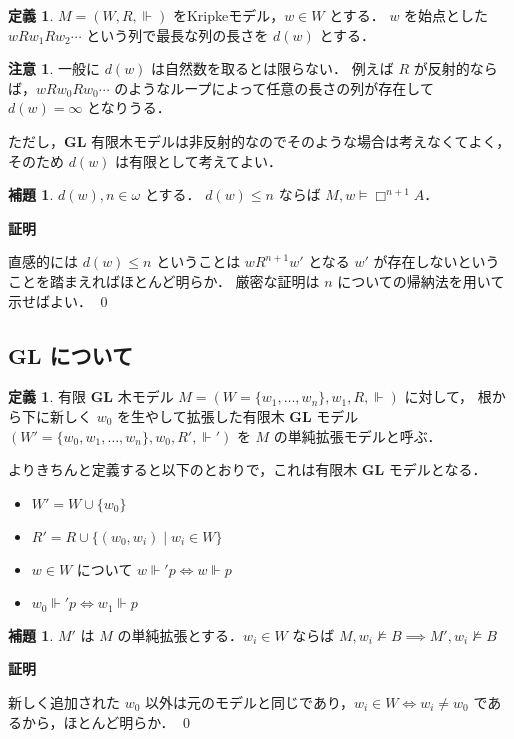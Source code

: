 \documentclass{jsarticle}
\makeatletter
\newcommand*{\Logic}[1]{\mathbf{#1}}
\newcommand*{\LogicGL}{\Logic{GL}}
\theoremstyle{definition}
\newtheorem{lemma}[theorem]{補題}
\newtheorem{definition}[theorem]{定義}
\newtheorem{remark}[theorem]{注意}
\renewcommand{\proofname}{証明}
\renewenvironment{proof}[1][\proofname]{\par
    \normalfont 
    \topsep6\p@\@plus6\p@\relax
    \trivlist
    \item\relax
    {\bfseries\gtfamily
    #1\@addpunct{.}}\hspace\labelsep\ignorespaces
    }{%
    \endtrivlist
    \@endpefalse
}
\makeatother
\begin{document}
\begin{definition}
	$M = (W, R, \Vdash)$ をKripkeモデル，$w \in W$ とする．
	$w$ を始点とした $w R w_1 R w_2 \cdots$ という列で最長な列の長さを $d(w)$ とする．
\end{definition}

\begin{remark}
	一般に $d(w)$ は自然数を取るとは限らない．
	例えば $R$ が反射的ならば，$w R w_0 R w_0 \cdots$ のようなループによって任意の長さの列が存在して $d(w) = \infty$ となりうる．

	ただし，$\LogicGL$ 有限木モデルは非反射的なのでそのような場合は考えなくてよく，そのため $d(w)$ は有限として考えてよい．
\end{remark}

\begin{lemma}\label{lem:cannot_access}
	$d(w), n \in \omega$ とする．
	$d(w) \leq n$ ならば $M,w \vDash \Box^{n + 1} A$．
\end{lemma}

\begin{proof}
	直感的には $d(w) \leq n$ ということは $w R^{n + 1} w'$ となる $w'$ が存在しないということを踏まえればほとんど明らか．
	厳密な証明は $n$ についての帰納法を用いて示せばよい．
	\qed
\end{proof}

\subsection{$\LogicGL$ について}

\begin{definition}
	有限 $\LogicGL$ 木モデル $M = (W = \{w_1,\dots,w_n\}, w_1, R, \Vdash)$ に対して，
	根から下に新しく $w_0$ を生やして拡張した有限木 $\LogicGL$ モデル $(W' = \{w_0,w_1,\dots,w_n\}, w_0, R', \Vdash')$ を $M$ の単純拡張モデルと呼ぶ．

	よりきちんと定義すると以下のとおりで，これは有限木 $\LogicGL$ モデルとなる．
	\begin{itemize}
		\item $W' = W \cup \{w_0\}$
		\item $R' = R \cup \{(w_0,w_i) \mid w_i \in W\}$
		\item $w \in W$ について $w \Vdash' p \iff w \Vdash p$
		\item $w_0 \Vdash' p \iff w_1 \Vdash p$
	\end{itemize}
\end{definition}

\begin{lemma}\label{lem:simple_extension}
	$M'$ は $M$ の単純拡張とする．$w_i \in W$ ならば $M,w_i \nvDash B \implies M',w_i \nvDash B$
\end{lemma}
\begin{proof}
	新しく追加された $w_0$ 以外は元のモデルと同じであり，$w_i \in W \iff w_i \neq w_0$ であるから，ほとんど明らか．
	\qed
\end{proof}
\end{document}
